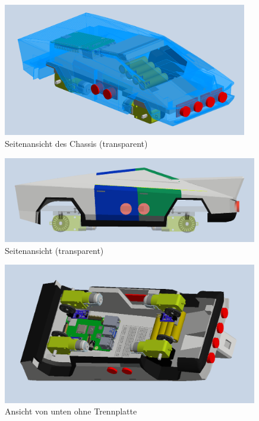 \begin{figure}[h]
    \centering
    \includegraphics[width=0.95\textwidth]{Resources/seitlich_chassi_transparent.png}
    \caption{Seitenansicht des Chassis (transparent)}
\end{figure}

\newpage

\begin{figure}[h]
    \centering
    \includegraphics[width=0.99\textwidth]{Resources/seitlich_transparent.png}
    \caption{Seitenansicht (transparent)}
\end{figure}

\begin{figure}[h]
    \centering
    \includegraphics[width=0.99\textwidth]{Resources/unten_ohne_trennplatte.png}
    \caption{Ansicht von unten ohne Trennplatte}
\end{figure}

